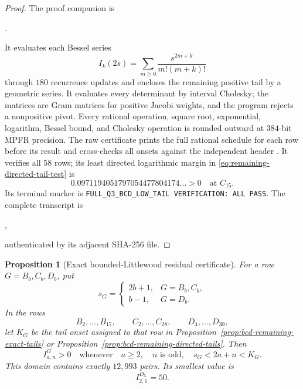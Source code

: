 \documentclass[11pt,reqno]{amsart}
\theoremstyle{plain}
\newtheorem{proposition}[theorem]{Proposition}
\theoremstyle{definition}
\begin{document}
\begin{proof}
The proof companion is
\begin{center}
.
\end{center}
It evaluates each Bessel series
\[
 I_k(2s)=\sum_{m\geq0}\frac{s^{2m+k}}{m!(m+k)!}
\]
through $180$ recurrence updates and encloses the remaining positive tail
by a geometric series.  It evaluates every determinant by interval Cholesky;
the matrices are Gram matrices for positive Jacobi weights, and the program
rejects a nonpositive pivot.  Every rational operation, square root,
exponential, logarithm, Bessel bound, and Cholesky operation is rounded
outward at $384$-bit MPFR precision.  The raw certificate prints the full
rational schedule for each row before its result and cross-checks all onsets
against the independent header
.
It verifies all $58$ rows; its least directed logarithmic margin in
\eqref{eq:remaining-directed-tail-test} is
\[
 0.0971194051797054477804174\ldots>0
 \quad\text{at }C_{15}.
\]
Its terminal marker is
\texttt{FULL\_Q3\_BCD\_LOW\_TAIL VERIFICATION: ALL PASS}.
The complete transcript is
\begin{center}
,
\end{center}
authenticated by its adjacent SHA-256 file.
\end{proof}

\begin{proposition}[Exact bounded-Littlewood residual certificate]
\label{prop:bcd-bounded-littlewood-residual-certificate}
For a row $G=B_b,C_b,D_b$, put
\[
 s_G=\begin{cases}2b+1,&G=B_b,C_b,\\ b-1,&G=D_b.\end{cases}
\]
In the rows
\[
 B_2,\ldots,B_{17},\qquad
 C_2,\ldots,C_{28},\qquad
 D_4,\ldots,D_{30},
\]
let $K_G$ be the tail onset assigned to that row in
Proposition~\ref{prop:bcd-remaining-exact-tails} or
Proposition~\ref{prop:bcd-remaining-directed-tails}.  Then
\[
 I^G_{a,n}>0
 \quad\text{whenever}\quad
 a\geq2,\quad n\text{ is odd},\quad s_G<2a+n<K_G.
\]
This domain contains exactly $12{,}993$ pairs.  Its smallest value is
\[
 I^{D_5}_{2,1}=50.
\]
\end{proposition}
\end{document}
